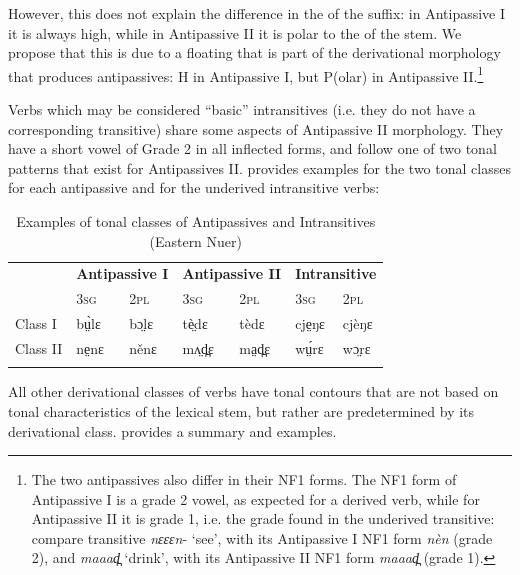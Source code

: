 \documentclass[output=paper
,newtxmath
,modfonts
,nonflat]{langsci/langscibook}
\begin{document}
However, this does not explain the difference in the  of the suffix: in Antipassive I it is always high, while in Antipassive II it is polar to the  of the stem.  We propose that this is due to a floating  that is part of the derivational morphology that produces antipassives: H in Antipassive I, but P(olar) in Antipassive II.\footnote{The two antipassives also differ in their NF1 forms. The NF1 form of Antipassive I is a grade 2 vowel, as expected for a derived verb, while for Antipassive II it is grade 1, i.e. the grade found in the underived transitive: compare transitive \textit{nɛɛɛn}{}- ‘see’, with its Antipassive I NF1 form \textit{nèn} (grade 2), and \textit{maaad̪} ‘drink’, with its Antipassive II NF1 form \textit{maaad̪} (grade 1).}  

Verbs which may be considered “basic” intransitives (i.e. they do not have a corresponding transitive) share some aspects of Antipassive II morphology.  They have a short vowel of Grade 2 in all inflected forms, and follow one of two tonal patterns that exist for Antipassives II.   provides examples for the two tonal classes for each antipassive and for the underived intransitive verbs:

\begin{table}
\begin{tabularx}{\textwidth}{XXXXXXX} 
\lsptoprule
& \multicolumn{2}{l}{\bfseries Antipassive I} & \multicolumn{2}{l}{\bfseries Antipassive II} & \multicolumn{2}{c}{\bfseries Intransitive}\\
& 3\textsc{sg} & 2\textsc{pl} & 3\textsc{sg} & 2\textsc{pl} & 3\textsc{sg} & 2\textsc{pl}\\
\midrule
Class I & bṳ̀lɛ & bɔ̤lɛ & tè̤dɛ & tèdɛ & cje̤ŋɛ & cjèŋɛ\\
Class II & ne̤nɛ & něnɛ & mʌ̤d̪ɛ & ma̤d̪ɛ & wṳ́rɛ & wɔ̤rɛ\\
\lspbottomrule
\end{tabularx}
\caption{Examples of tonal classes of Antipassives and Intransitives (Eastern Nuer)}
\label{tab:monich:14}
\end{table}

All other derivational classes of verbs have tonal contours that are not based on tonal characteristics of the lexical stem, but rather are predetermined by its derivational class.   provides a summary and examples.
\end{document}
